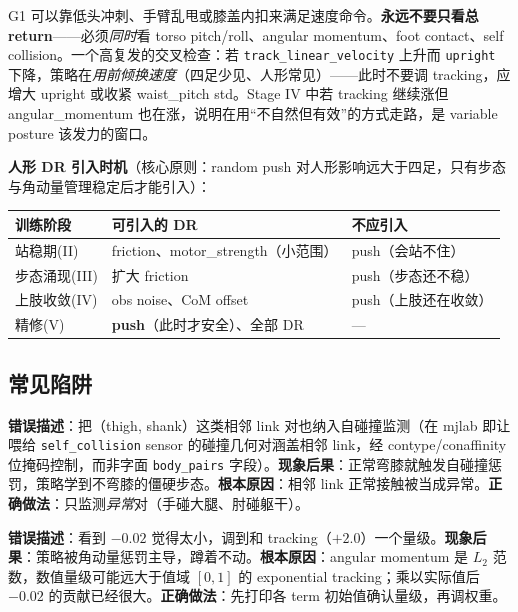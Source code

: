 \begin{insight}\label{ins:rlmc-hl-rewardhack}
G1 可以靠低头冲刺、手臂乱甩或膝盖内扣来满足速度命令。\textbf{永远不要只看总 return}——必须\emph{同时}看 torso pitch/roll、angular momentum、foot contact、self collision。一个高复发的交叉检查：若 \texttt{track\_linear\_velocity} 上升而 \texttt{upright} 下降，策略在\emph{用前倾换速度}（四足少见、人形常见）——此时不要调 tracking，应增大 upright 或收紧 waist\_pitch std。Stage IV 中若 tracking 继续涨但 angular\_momentum 也在涨，说明在用“不自然但有效”的方式走路，是 variable posture 该发力的窗口。
\end{insight}

\textbf{人形 DR 引入时机}（核心原则：random push 对人形影响远大于四足，只有步态与角动量管理稳定后才能引入）：

\begin{center}
\small
\begin{tabular}{lll}
\hline
训练阶段 & 可引入的 DR & 不应引入 \\
\hline
站稳期(II) & friction、motor\_strength（小范围） & push（会站不住） \\
步态涌现(III) & 扩大 friction & push（步态还不稳） \\
上肢收敛(IV) & obs noise、CoM offset & push（上肢还在收敛） \\
精修(V) & \textbf{push}（此时才安全）、全部 DR & --- \\
\hline
\end{tabular}
\end{center}

\subsection{常见陷阱}
\begin{pitfall}
\textbf{错误描述}：把（thigh, shank）这类相邻 link 对也纳入自碰撞监测（在 mjlab 即让喂给 \texttt{self\_collision} sensor 的碰撞几何对涵盖相邻 link，经 contype/conaffinity 位掩码控制，而非字面 \texttt{body\_pairs} 字段）。\textbf{现象后果}：正常弯膝就触发自碰撞惩罚，策略学到不弯膝的僵硬步态。\textbf{根本原因}：相邻 link 正常接触被当成异常。\textbf{正确做法}：只监测\emph{异常}对（手碰大腿、肘碰躯干）。
\end{pitfall}

\begin{pitfall}
\textbf{错误描述}：看到 $-0.02$ 觉得太小，调到和 tracking（$+2.0$）一个量级。\textbf{现象后果}：策略被角动量惩罚主导，蹲着不动。\textbf{根本原因}：angular momentum 是 $L_2$ 范数，数值量级可能远大于值域 $[0,1]$ 的 exponential tracking；乘以实际值后 $-0.02$ 的贡献已经很大。\textbf{正确做法}：先打印各 term 初始值确认量级，再调权重。
\end{pitfall}

